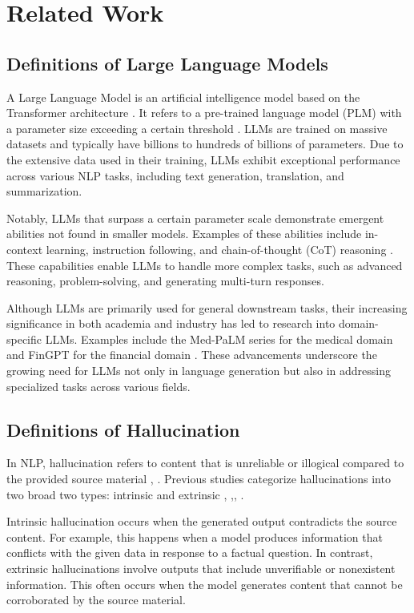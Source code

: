 \section{Related Work}
\label{sec:relatedwork}

\subsection{Definitions of Large Language Models}
A Large Language Model is an artificial intelligence model based on the Transformer architecture \cite{Vaswani2017}. It refers to a pre-trained language model (PLM) with a parameter size exceeding a certain threshold \cite{Zhao2023}. LLMs are trained on massive datasets and typically have billions to hundreds of billions of parameters. Due to the extensive data used in their training, LLMs exhibit exceptional performance across various NLP tasks, including text generation, translation, and summarization.

Notably, LLMs that surpass a certain parameter scale demonstrate emergent abilities not found in smaller models. Examples of these abilities include in-context learning, instruction following, and chain-of-thought (CoT) reasoning \cite{Wei2022}. These capabilities enable LLMs to handle more complex tasks, such as advanced reasoning, problem-solving, and generating multi-turn responses.

Although LLMs are primarily used for general downstream tasks, their increasing significance in both academia and industry has led to research into domain-specific LLMs. Examples include the Med-PaLM series for the medical domain \cite{Singhal2023} and FinGPT for the financial domain \cite{Yang2023}. These advancements underscore the growing need for LLMs not only in language generation but also in addressing specialized tasks across various fields.

\subsection{Definitions of Hallucination}
In NLP, hallucination refers to content that is unreliable or illogical compared to the provided source material \cite{Ji2023}, \cite{Maynez2020}. Previous studies categorize hallucinations into two broad two types: intrinsic and extrinsic \cite{Ji2023}, \cite{Maynez2020},\cite{Dziri2021}, \cite{Huang2023a}.

Intrinsic hallucination occurs when the generated output contradicts the source content. For example, this happens when a model produces information that conflicts with the given data in response to a factual question. In contrast, extrinsic hallucinations involve outputs that include unverifiable or nonexistent information. This often occurs when the model generates content that cannot be corroborated by the source material.

